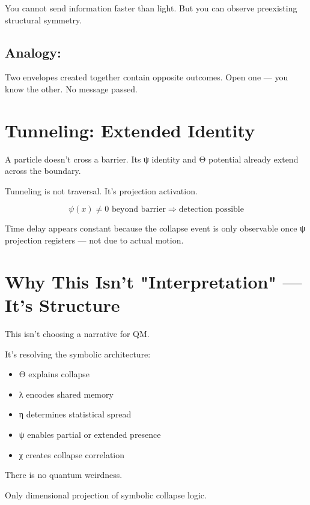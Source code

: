 You cannot send information faster than light. But you can observe preexisting structural symmetry.

\subsection*{Analogy:}

Two envelopes created together contain opposite outcomes. Open one — you know the other. No message passed.

\section{Tunneling: Extended Identity}

A particle doesn’t cross a barrier. Its ψ identity and Θ potential already extend across the boundary.

Tunneling is not traversal. It’s projection activation.

\[
\psi(x) \neq 0 \text{ beyond barrier} \Rightarrow \text{detection possible}
\]

Time delay appears constant because the collapse event is only observable once ψ projection registers — not due to actual motion.

\section{Why This Isn’t "Interpretation" — It’s Structure}

This isn’t choosing a narrative for QM.

It’s resolving the symbolic architecture:
\begin{itemize}
\item Θ explains collapse
\item λ encodes shared memory
\item η determines statistical spread
\item ψ enables partial or extended presence
\item χ creates collapse correlation
\end{itemize}

\bigskip

There is no quantum weirdness.

Only dimensional projection of symbolic collapse logic.
